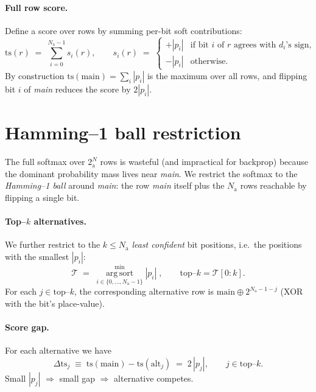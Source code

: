 \documentclass[11pt]{article}
\newcommand{\NAP}{N_{\!\text{a}}}
\newcommand{\nalt}{k}
\newcommand{\bts}{\mathrm{ts}}
\begin{document}
\paragraph{Full row score.} Define a score over rows by summing per-bit
soft contributions:
\begin{equation}
  \bts(r) \;=\; \sum_{i=0}^{\NAP-1} s_i(r), \qquad
  s_i(r) \;=\; \begin{cases}
    +|p_i| & \text{if bit } i \text{ of } r \text{ agrees with } d_i\text{'s sign}, \\
    -|p_i| & \text{otherwise.}
  \end{cases}
\end{equation}
By construction $\bts(\text{main}) = \sum_i |p_i|$ is the maximum over all
rows, and flipping bit $i$ of \emph{main} reduces the score by $2|p_i|$.

\section{Hamming--1 ball restriction}

The full softmax over $2^\NAP$ rows is wasteful (and impractical for backprop)
because the dominant probability mass lives near \emph{main}. We restrict the
softmax to the \emph{Hamming--1 ball} around \emph{main}: the row \emph{main}
itself plus the $\NAP$ rows reachable by flipping a single bit.

\paragraph{Top--$\nalt$ alternatives.}
We further restrict to the $\nalt \le \NAP$ \emph{least confident} bit
positions, i.e.\ the positions with the smallest $|p_i|$:
\begin{equation}
  \mathcal{T} \;=\; \operatorname*{arg\,sort}^{\min}_{i \in \{0,\ldots,\NAP-1\}} |p_i|\;,
  \qquad
  \text{top--}\nalt = \mathcal{T}[0:\nalt].
\end{equation}
For each $j \in \text{top--}\nalt$, the corresponding alternative row is
$\text{main} \oplus 2^{\NAP-1-j}$ (XOR with the bit's place-value).

\paragraph{Score gap.} For each alternative we have
\begin{equation}
  \Delta \bts_j \;\equiv\; \bts(\text{main}) - \bts(\text{alt}_j) \;=\; 2\,|p_j|,
  \qquad j \in \text{top--}\nalt.
\end{equation}
Small $|p_j|$ $\Rightarrow$ small gap $\Rightarrow$ alternative competes.
\end{document}
